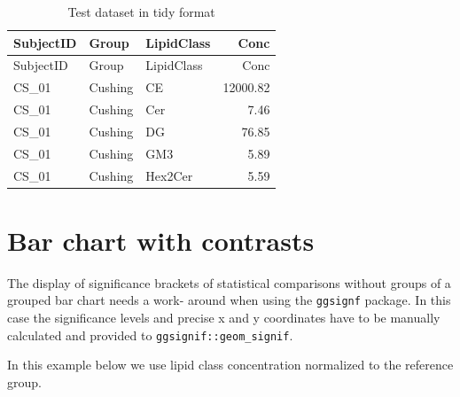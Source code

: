 \documentclass[
  letterpaper,
  DIV=11,
  numbers=noendperiod]{scrreprt}
\begin{document}
\hypertarget{tbl-data}{}
\begin{longtable}[]{@{}lllr@{}}
\caption{\label{tbl-data}Test dataset in tidy format}\tabularnewline
\toprule()
SubjectID & Group & LipidClass & Conc \\
\midrule()
\endfirsthead
\toprule()
SubjectID & Group & LipidClass & Conc \\
\midrule()
\endhead
CS\_01 & Cushing & CE & 12000.82 \\
CS\_01 & Cushing & Cer & 7.46 \\
CS\_01 & Cushing & DG & 76.85 \\
CS\_01 & Cushing & GM3 & 5.89 \\
CS\_01 & Cushing & Hex2Cer & 5.59 \\
\bottomrule()
\end{longtable}

\hypertarget{bar-chart-with-contrasts-1}{%
\section{Bar chart with contrasts}\label{bar-chart-with-contrasts-1}}

The display of significance brackets of statistical comparisons without
groups of a grouped bar chart needs a work- around when using the
\texttt{ggsignf} package. In this case the significance levels and
precise x and y coordinates have to be manually calculated and provided
to \texttt{ggsignif::geom\_signif}.

In this example below we use lipid class concentration normalized to the
reference group.
\end{document}
